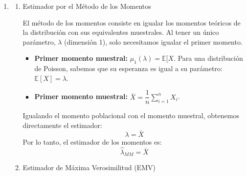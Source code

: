 \begin{enumerate}[label=\color{red}\textbf{\arabic*)}]
\begin{enumerate}[label=\arabic*)]
		            Es estimador de máxima verosimilitud $\hat{\theta}$ es el valor que maximiza la función $L_n(\theta)$. Es decir, se cumple la siguiente desigualdad para cualquier otro valor admisible de $\theta$: \[
			            L_n(\hat{\theta})\ge L_n(\theta),\quad \forall \theta \in \Theta
		            \]
		      \item Aplicación de la monotonía:

		            Dado que $L_n(\theta)>0$ y que el logaritmo es estrictamente creciente, podemos aplicar el logaritmo a ambos lados de la desigualdad sin alterar su sentido: \[
			            \log(L_n(\hat{\theta}))\ge \log(L_n(\theta)),\quad \forall \theta\in \Theta
		            \]
		      \item Conclusión:

		            La desigualdad anterior demuestra que el mismo valor $\hat{\theta}$ que hace máxima a la función de $L_n(\theta)$ también hace máxima a la función $\log(L_n(\theta))$. Utilizando la notación de maximización, podemos concluir la equivalencia: \[
			            \operatorname*{argmax}_{\theta\in \Theta}L_n(\theta)=\operatorname*{argmax}_{\theta\in \Theta}\log(L_n(\theta))
		            \]
	      \end{enumerate}
	\item {}

	      \begin{enumerate}[label=\arabic*)]
		      \item Estimador por el Método de los Momentos

		            El método de los momentos consiste en igualar los momentos teóricos de la distribución con sus equivalentes muestrales. Al tener un único parámetro, $\lambda$ (dimensión 1), solo necesitamos igualar el primer momento.
		            \begin{itemize}[label=\textbullet]
			            \item \textbf{Primer momento muestral:} $\mu_1(\lambda)=\mathbb{E}[X$. Para una distribución de Poisson, sabemos que su esperanza es igual a su parámetro: $\mathbb{E}[X]=\lambda$.
			            \item \textbf{Primer momento muestral:} $\bar{X}=\dfrac{1}{n}\sum_{i=1}^{n} X_i$.
		            \end{itemize}
		            Igualando el momento poblacional con el momento muestral, obtenemos directamente el estimador: \[
			            \lambda=\bar{X}
		            \]
		            Por lo tanto, el estimador de los momentos es: \[
			            \hat{\lambda}_{MM}=\bar{X}
		            \]
		      \item Estimador de Máxima Verosimilitud (EMV)


\end{enumerate}
\end{enumerate}
